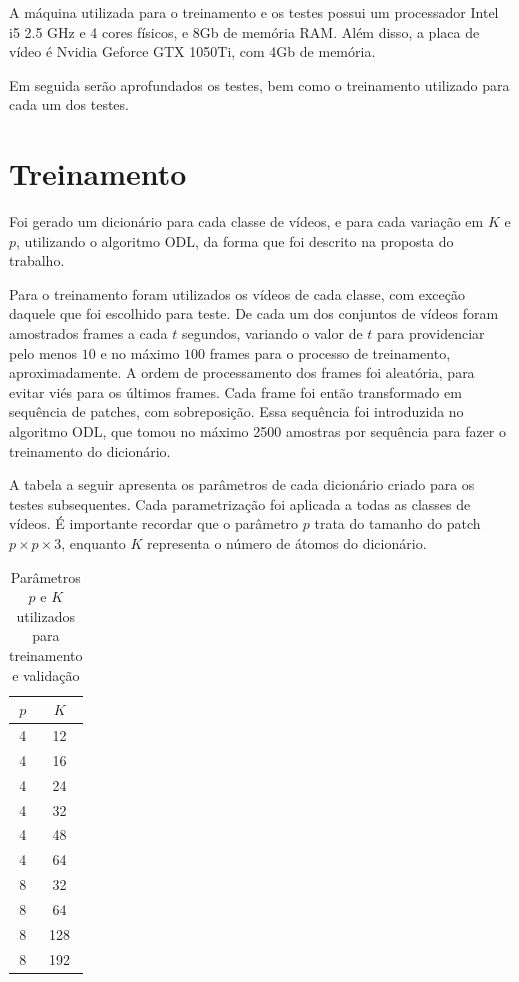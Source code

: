 \documentclass[cic,tc]{iiufrgs}
\begin{document}
A máquina utilizada para o treinamento e os testes possui um processador Intel i5 2.5 GHz e 4 cores físicos,
e 8Gb de memória RAM.
Além disso, a placa de vídeo é Nvidia Geforce GTX 1050Ti, com 4Gb de memória.

Em seguida serão aprofundados os testes, bem como o treinamento utilizado para cada um dos testes.

\section{Treinamento}
Foi gerado um dicionário para cada classe de vídeos, e para cada variação em $K$ e $p$,
utilizando o algoritmo ODL, da forma que foi descrito na proposta do trabalho.

Para o treinamento foram utilizados os vídeos de cada classe, com exceção daquele
que foi escolhido para teste.
De cada um dos conjuntos de vídeos foram amostrados frames a cada $t$ segundos, variando
o valor de $t$ para providenciar pelo menos $10$ e no máximo $100$ frames para o processo 
de treinamento, aproximadamente.
A ordem de processamento dos frames foi aleatória, para evitar viés para os últimos frames. 
Cada frame foi então transformado em sequência de patches, com sobreposição.
Essa sequência foi introduzida no algoritmo ODL, que tomou no máximo 2500 amostras por sequência
para fazer o treinamento do dicionário.

A tabela a seguir apresenta os parâmetros de cada dicionário criado para os testes subsequentes.
Cada parametrização foi aplicada a todas as classes de vídeos.
É importante recordar que o parâmetro $p$ trata do tamanho do patch $p \times p \times 3$, 
enquanto $K$ representa o número de átomos do dicionário.
\begin{table}[h]
    \caption{Parâmetros $p$ e $K$ utilizados para treinamento e validação}
    \centering
        \begin{tabular}{|c|c|}
          \hline
          \multicolumn{1}{|c}{\textit{$p$}} & 
          \multicolumn{1}{|c|}{\textit{$K$}} \\
          \hline
          \hline
          4 & 12 \\
          4 & 16 \\
          4 & 24 \\
          4 & 32 \\
          4 & 48 \\
          4 & 64 \\
          \hline
          8 & 32 \\
          8 & 64 \\
          8 & 128 \\
          8 & 192 \\
          \hline
        \end{tabular}
    \label{tbl:testparams}
\end{table}
\end{document}
